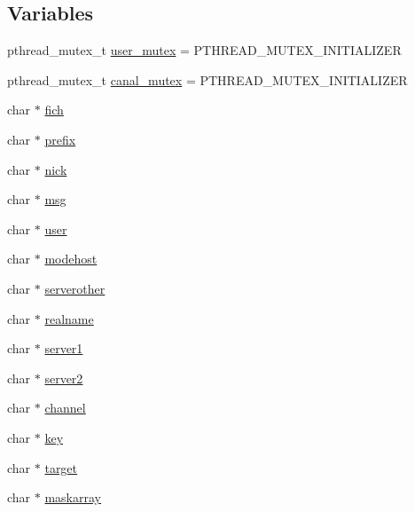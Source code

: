 \subsection*{Variables}
\begin{DoxyCompactItemize}
\item 
pthread\+\_\+mutex\+\_\+t \hyperlink{_g-2361-06-_p1-_server_8c_a5dedd07a1144d2ab70b74a8e64b6a7c0}{user\+\_\+mutex} = P\+T\+H\+R\+E\+A\+D\+\_\+\+M\+U\+T\+E\+X\+\_\+\+I\+N\+I\+T\+I\+A\+L\+I\+Z\+E\+R
\item 
pthread\+\_\+mutex\+\_\+t \hyperlink{_g-2361-06-_p1-_server_8c_ab86a544a49de18195048bac54dd3ac3e}{canal\+\_\+mutex} = P\+T\+H\+R\+E\+A\+D\+\_\+\+M\+U\+T\+E\+X\+\_\+\+I\+N\+I\+T\+I\+A\+L\+I\+Z\+E\+R
\item 
char $\ast$ \hyperlink{_g-2361-06-_p1-_server_8c_a5666511ca3d4a3dc685c6f14c663aed5}{fich}
\item 
char $\ast$ \hyperlink{_g-2361-06-_p1-_server_8c_ad2849cf781a4db22cc1b31eaaee50a4f}{prefix}
\item 
char $\ast$ \hyperlink{_g-2361-06-_p1-_server_8c_a89f27568c92a418413e6b37b41f07e21}{nick}
\item 
char $\ast$ \hyperlink{_g-2361-06-_p1-_server_8c_a32d2f5216cddb59c7cc8fb2806a7e727}{msg}
\item 
char $\ast$ \hyperlink{_g-2361-06-_p1-_server_8c_a14871705f45ccdc5bb9f4549efd8e119}{user}
\item 
char $\ast$ \hyperlink{_g-2361-06-_p1-_server_8c_a4f28f55d19ac069eabc38c224c3a4225}{modehost}
\item 
char $\ast$ \hyperlink{_g-2361-06-_p1-_server_8c_ae6eaaf28b08889a7ec2359f8968d796c}{serverother}
\item 
char $\ast$ \hyperlink{_g-2361-06-_p1-_server_8c_a980ab011cd3d327b370c042833f1dc08}{realname}
\item 
char $\ast$ \hyperlink{_g-2361-06-_p1-_server_8c_a9045e9ee0087b60273244cd6c2f91a5f}{server1}
\item 
char $\ast$ \hyperlink{_g-2361-06-_p1-_server_8c_a70dd311bef3d0b4160a7ce0706f8f4cc}{server2}
\item 
char $\ast$ \hyperlink{_g-2361-06-_p1-_server_8c_a842ca2f026578e5c479c095ff3335969}{channel}
\item 
char $\ast$ \hyperlink{_g-2361-06-_p1-_server_8c_a5892a9181e6a332f84d27aecd41dcd12}{key}
\item 
char $\ast$ \hyperlink{_g-2361-06-_p1-_server_8c_a23b26cdb3a71f525caf03b57f68d47fa}{target}
\item 
char $\ast$ \hyperlink{_g-2361-06-_p1-_server_8c_ad51a4303b7c769561b12bf04a68bc042}{maskarray}

\end{DoxyCompactItemize}
